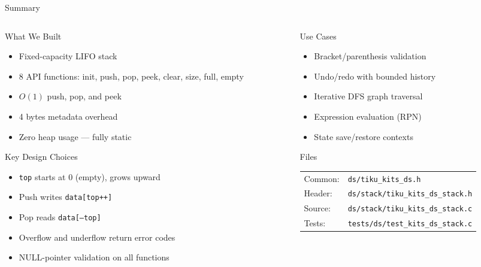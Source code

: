 \documentclass[aspectratio=169, 10pt]{beamer}
\begin{document}
\begin{frame}{Summary}
\begin{columns}[T]
\begin{column}{0.48\textwidth}
\begin{block}{What We Built}
\begin{itemize}
  \item Fixed-capacity LIFO stack
  \item 8 API functions: init, push, pop, peek, clear, size, full, empty
  \item $O(1)$ push, pop, and peek
  \item 4 bytes metadata overhead
  \item Zero heap usage --- fully static
\end{itemize}
\end{block}

\begin{block}{Key Design Choices}
\begin{itemize}
  \item \texttt{top} starts at 0 (empty), grows upward
  \item Push writes \texttt{data[top++]}
  \item Pop reads \texttt{data[--top]}
  \item Overflow and underflow return error codes
  \item NULL-pointer validation on all functions
\end{itemize}
\end{block}
\end{column}

\begin{column}{0.48\textwidth}
\begin{block}{Use Cases}
\begin{itemize}
  \item Bracket/parenthesis validation
  \item Undo/redo with bounded history
  \item Iterative DFS graph traversal
  \item Expression evaluation (RPN)
  \item State save/restore contexts
\end{itemize}
\end{block}

\begin{block}{Files}
\scriptsize
\begin{tabular}{@{}lp{4.5cm}@{}}
Common: & \texttt{ds/tiku\_kits\_ds.h} \\
Header: & \texttt{ds/stack/tiku\_kits\_ds\_stack.h} \\
Source: & \texttt{ds/stack/tiku\_kits\_ds\_stack.c} \\
Tests:  & \texttt{tests/ds/test\_kits\_ds\_stack.c} \\
\end{tabular}
\end{block}
\end{column}
\end{columns}
\end{frame}
\end{document}
